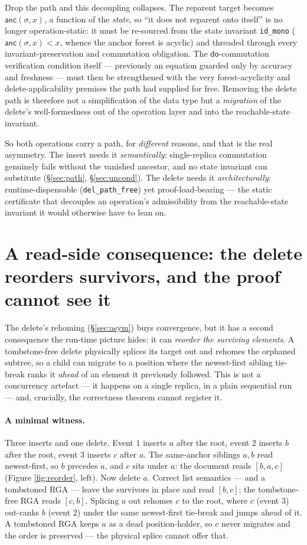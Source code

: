 \documentclass[11pt]{article}
\newcommand{\anc}{\mathsf{anc}}
\newcommand{\doo}{\mathsf{do}}
\begin{document}
Drop the path and this decoupling collapses. The reparent target becomes
$\anc(\sigma,x)$, a function of the \emph{state}, so ``it does not reparent onto
itself'' is no longer operation-static: it must be re-sourced from the state
invariant \texttt{id\_mono} ($\anc(\sigma,x)<x$, whence the anchor forest is acyclic)
and threaded through every invariant-preservation and commutation obligation. The
$\doo$-commutation verification condition itself --- previously an equation guarded
only by accuracy and freshness --- must then be strengthened with the very
forest-acyclicity and delete-applicability premises the path had supplied for free.
Removing the delete path is therefore not a simplification of the data type but a
\emph{migration} of the delete's well-formedness out of the operation layer and into
the reachable-state invariant.

So both operations carry a path, for \emph{different} reasons, and that is the real
asymmetry. The insert needs it \emph{semantically}: single-replica commutation
genuinely fails without the vanished ancestor, and no state invariant can substitute
(\S\ref{sec:path}, \S\ref{sec:uncond}). The delete needs it \emph{architecturally}:
runtime-dispensable (\texttt{del\_path\_free}) yet proof-load-bearing --- the static
certificate that decouples an operation's admissibility from the reachable-state
invariant it would otherwise have to lean on.

\section{A read-side consequence: the delete reorders survivors, and the proof cannot see it}
\label{sec:reorder}

The delete's rehoming (\S\ref{sec:asym}) buys convergence, but it has a second
consequence the run-time picture hides: it can \emph{reorder the surviving
elements}. A tombstone-free delete physically splices its target out and rehomes
the orphaned subtree, so a child can migrate to a position where the newest-first
sibling tie-break ranks it \emph{ahead} of an element it previously followed. This
is not a concurrency artefact --- it happens on a single replica, in a plain
sequential run --- and, crucially, the correctness theorem cannot register it.

\paragraph{A minimal witness.} Three inserts and one delete. Event $1$ inserts $a$
after the root, event $2$ inserts $b$ after the root, event $3$ inserts $c$ after
$a$. The same-anchor siblings $a,b$ read newest-first, so $b$ precedes $a$, and $c$
sits under $a$: the document reads $[b,a,c]$ (Figure \ref{fig:reorder}, left). Now
delete $a$. Correct list semantics --- and a tombstoned RGA --- leave the
survivors in place and read $[b,c]$; the tombstone-free RGA reads $[c,b]$. Splicing
$a$ out rehomes $c$ to the root, where $c$ (event $3$) out-ranks $b$ (event $2$)
under the same newest-first tie-break and jumps ahead of it. A tombstoned RGA keeps
$a$ as a dead position-holder, so $c$ never migrates and the order is preserved ---
the physical splice cannot offer that.
\end{document}
